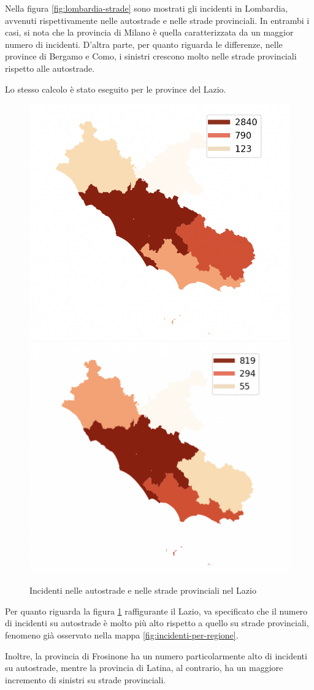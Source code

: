 \documentclass[a4paper,12pt]{report}
\begin{document}
Nella figura \ref{fig:lombardia-strade} sono mostrati gli incidenti in Lombardia, 
avvenuti rispettivamente nelle autostrade e nelle strade provinciali.
In entrambi i casi, si nota che la provincia di Milano è quella caratterizzata da 
un maggior numero di incidenti. 
D'altra parte, per quanto riguarda le differenze, nelle province di Bergamo e Como, 
i sinistri crescono molto nelle strade provinciali rispetto alle autostrade.

Lo stesso calcolo è stato eseguito per le province del Lazio.

\begin{figure}
    \includegraphics[width=0.5\linewidth]{../src/provincia/lazio_autostrade.png}
    \includegraphics[width=0.5\linewidth]{../src/provincia/lazio_strade_prov.png}
    \caption{Incidenti nelle autostrade e nelle strade provinciali nel Lazio}
    \label{fig:lazio-strade}
\end{figure}

Per quanto riguarda la figura \ref{fig:lazio-strade} raffigurante il Lazio, va 
specificato che il numero di incidenti su autostrade è molto più alto rispetto 
a quello su strade provinciali, 
fenomeno già osservato nella mappa \ref{fig:incidenti-per-regione}.

Inoltre, la provincia di Frosinone ha un numero particolarmente alto di incidenti su 
autostrade, mentre la provincia di Latina, al contrario, ha un maggiore incremento di 
sinistri su strade provinciali.
\end{document}
